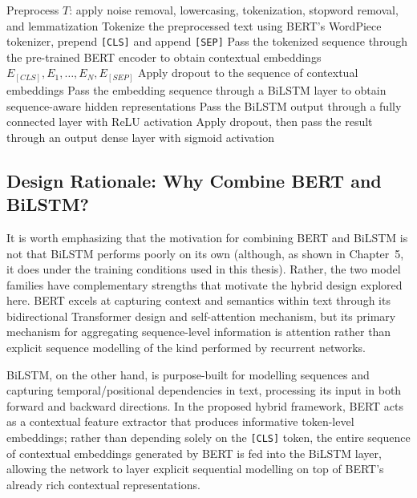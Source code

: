 \begin{algorithm}[H]
\SetAlgoLined
{}
Preprocess $T$: apply noise removal, lowercasing, tokenization, stopword removal, and lemmatization\;
Tokenize the preprocessed text using BERT's WordPiece tokenizer, prepend \texttt{[CLS]} and append \texttt{[SEP]}\;
Pass the tokenized sequence through the pre-trained BERT encoder to obtain contextual embeddings $E_{[CLS]}, E_1, \ldots, E_N, E_{[SEP]}$\;
Apply dropout to the sequence of contextual embeddings\;
Pass the embedding sequence through a BiLSTM layer to obtain sequence-aware hidden representations\;
Pass the BiLSTM output through a fully connected layer with ReLU activation\;
Apply dropout, then pass the result through an output dense layer with sigmoid activation\;
\;
\caption{Fake News Detection using the Proposed BERT + BiLSTM Model}
\label{alg:bertbilstm}
\end{algorithm}

\subsection{Design Rationale: Why Combine BERT and BiLSTM?}

It is worth emphasizing that the motivation for combining BERT and BiLSTM is not that BiLSTM performs poorly on its own (although, as shown in Chapter~5, it does under the training conditions used in this thesis). Rather, the two model families have complementary strengths that motivate the hybrid design explored here. BERT excels at capturing context and semantics within text through its bidirectional Transformer design and self-attention mechanism, but its primary mechanism for aggregating sequence-level information is attention rather than explicit sequence modelling of the kind performed by recurrent networks.

BiLSTM, on the other hand, is purpose-built for modelling sequences and capturing temporal/positional dependencies in text, processing its input in both forward and backward directions. In the proposed hybrid framework, BERT acts as a contextual feature extractor that produces informative token-level embeddings; rather than depending solely on the \texttt{[CLS]} token, the entire sequence of contextual embeddings generated by BERT is fed into the BiLSTM layer, allowing the network to layer explicit sequential modelling on top of BERT's already rich contextual representations.

